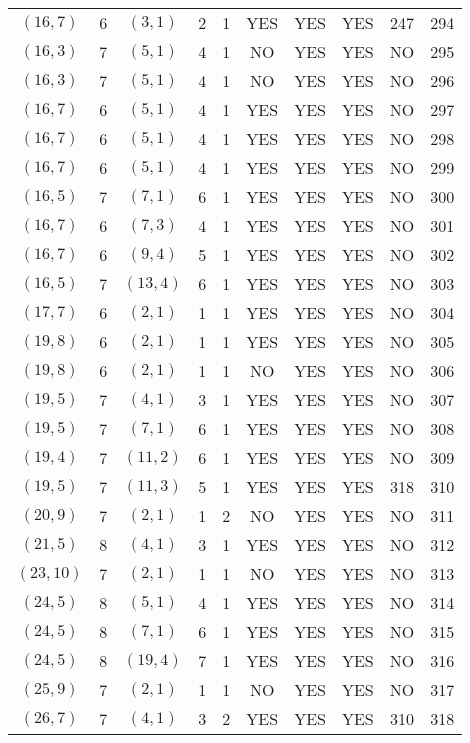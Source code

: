 \begin{longtable}{|c|c|c|c|c|c|c|c|c|c|}
$(16, 7)$ & 6 & $(3, 1)$ & 2 & 1 & YES & YES & YES & 247 & 294\\
$(16, 3)$ & 7 & $(5, 1)$ & 4 & 1 & NO & YES & YES & NO & 295\\
$(16, 3)$ & 7 & $(5, 1)$ & 4 & 1 & NO & YES & YES & NO & 296\\
$(16, 7)$ & 6 & $(5, 1)$ & 4 & 1 & YES & YES & YES & NO & 297\\
$(16, 7)$ & 6 & $(5, 1)$ & 4 & 1 & YES & YES & YES & NO & 298\\
$(16, 7)$ & 6 & $(5, 1)$ & 4 & 1 & YES & YES & YES & NO & 299\\
$(16, 5)$ & 7 & $(7, 1)$ & 6 & 1 & YES & YES & YES & NO & 300\\
$(16, 7)$ & 6 & $(7, 3)$ & 4 & 1 & YES & YES & YES & NO & 301\\
$(16, 7)$ & 6 & $(9, 4)$ & 5 & 1 & YES & YES & YES & NO & 302\\
$(16, 5)$ & 7 & $(13, 4)$ & 6 & 1 & YES & YES & YES & NO & 303\\
$(17, 7)$ & 6 & $(2, 1)$ & 1 & 1 & YES & YES & YES & NO & 304\\
$(19, 8)$ & 6 & $(2, 1)$ & 1 & 1 & YES & YES & YES & NO & 305\\
$(19, 8)$ & 6 & $(2, 1)$ & 1 & 1 & NO & YES & YES & NO & 306\\
$(19, 5)$ & 7 & $(4, 1)$ & 3 & 1 & YES & YES & YES & NO & 307\\
$(19, 5)$ & 7 & $(7, 1)$ & 6 & 1 & YES & YES & YES & NO & 308\\
$(19, 4)$ & 7 & $(11, 2)$ & 6 & 1 & YES & YES & YES & NO & 309\\
$(19, 5)$ & 7 & $(11, 3)$ & 5 & 1 & YES & YES & YES & 318 & 310\\
$(20, 9)$ & 7 & $(2, 1)$ & 1 & 2 & NO & YES & YES & NO & 311\\
$(21, 5)$ & 8 & $(4, 1)$ & 3 & 1 & YES & YES & YES & NO & 312\\
$(23, 10)$ & 7 & $(2, 1)$ & 1 & 1 & NO & YES & YES & NO & 313\\
$(24, 5)$ & 8 & $(5, 1)$ & 4 & 1 & YES & YES & YES & NO & 314\\
$(24, 5)$ & 8 & $(7, 1)$ & 6 & 1 & YES & YES & YES & NO & 315\\
$(24, 5)$ & 8 & $(19, 4)$ & 7 & 1 & YES & YES & YES & NO & 316\\
$(25, 9)$ & 7 & $(2, 1)$ & 1 & 1 & NO & YES & YES & NO & 317\\
$(26, 7)$ & 7 & $(4, 1)$ & 3 & 2 & YES & YES & YES & 310 & 318\\

\end{longtable}
